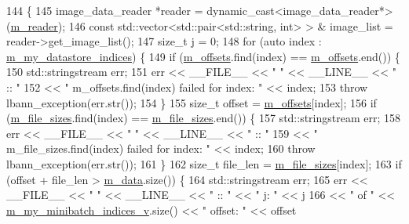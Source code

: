 \begin{DoxyCode}
144                                      \{
145   image\_data\_reader *reader = \textcolor{keyword}{dynamic\_cast<}image\_data\_reader*\textcolor{keyword}{>}(\hyperlink{classlbann_1_1generic__data__store_afa49ced0ab64c632371ea52532a91ec2}{m\_reader});
146   \textcolor{keyword}{const} std::vector<std::pair<std::string, int> > & image\_list = reader->get\_image\_list();
147   \textcolor{keywordtype}{size\_t} j = 0;
148   \textcolor{keywordflow}{for} (\textcolor{keyword}{auto} index : \hyperlink{classlbann_1_1generic__data__store_abd38f8d8aab0648959e09d011abfe20a}{m\_my\_datastore\_indices}) \{
149     \textcolor{keywordflow}{if} (\hyperlink{classlbann_1_1data__store__image_ae5a9ba5fb1bf4d3147743012b8099038}{m\_offsets}.find(index) == \hyperlink{classlbann_1_1data__store__image_ae5a9ba5fb1bf4d3147743012b8099038}{m\_offsets}.end()) \{
150       std::stringstream err;
151       err << \_\_FILE\_\_ << \textcolor{stringliteral}{" "} << \_\_LINE\_\_ << \textcolor{stringliteral}{" :: "} 
152           << \textcolor{stringliteral}{" m\_offsets.find(index) failed for index: "} << index;
153       \textcolor{keywordflow}{throw} lbann\_exception(err.str());
154     \}
155     \textcolor{keywordtype}{size\_t} offset = \hyperlink{classlbann_1_1data__store__image_ae5a9ba5fb1bf4d3147743012b8099038}{m\_offsets}[index];
156     \textcolor{keywordflow}{if} (\hyperlink{classlbann_1_1data__store__image_a1903176a4b305fd42617ea1cb6d997ae}{m\_file\_sizes}.find(index) == \hyperlink{classlbann_1_1data__store__image_a1903176a4b305fd42617ea1cb6d997ae}{m\_file\_sizes}.end()) \{
157       std::stringstream err;
158       err << \_\_FILE\_\_ << \textcolor{stringliteral}{" "} << \_\_LINE\_\_ << \textcolor{stringliteral}{" :: "} 
159           << \textcolor{stringliteral}{" m\_file\_sizes.find(index) failed for index: "} << index;
160       \textcolor{keywordflow}{throw} lbann\_exception(err.str());
161     \}
162     \textcolor{keywordtype}{size\_t} file\_len = \hyperlink{classlbann_1_1data__store__image_a1903176a4b305fd42617ea1cb6d997ae}{m\_file\_sizes}[index];
163     \textcolor{keywordflow}{if} (offset + file\_len > \hyperlink{classlbann_1_1data__store__image_a10e9aa0c240785bc0a961f24e87a1c16}{m\_data}.size()) \{
164       std::stringstream err;
165       err << \_\_FILE\_\_ << \textcolor{stringliteral}{" "} << \_\_LINE\_\_ << \textcolor{stringliteral}{" :: "} << \textcolor{stringliteral}{" j: "} << j 
166         << \textcolor{stringliteral}{" of "} << \hyperlink{classlbann_1_1generic__data__store_a41f7fec1f1f3d6568a5765be7a6784eb}{m\_my\_minibatch\_indices\_v}.size() << \textcolor{stringliteral}{" offset: "} << offset

\end{DoxyCode}
